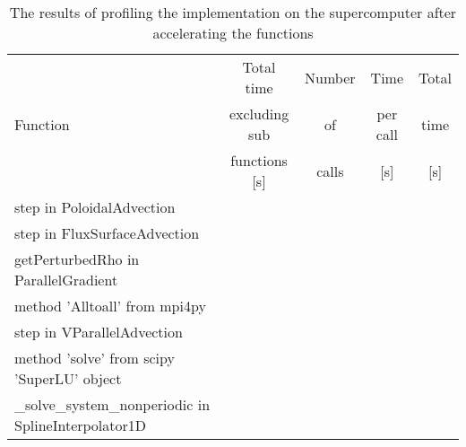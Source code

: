 \begin{table}[ht]
\centering
 \begin{tabular}{|m{}|c|c|c|c|}
  \hline
          & Total time & Number & Time & Total \\
  Function & excluding sub & of & per call & time \\
          & functions [s] & calls & [s] & [s] \\
  \hline
  \hline
  step in PoloidalAdvection &  &  &  &  \\
  \hline
  step in FluxSurfaceAdvection &  &  &  &  \\
  \hline
  getPerturbedRho in ParallelGradient &  &  &  & \\
  \hline
  method 'Alltoall' from mpi4py &  &  &  & \\
  \hline
  step in VParallelAdvection &  &  &  & \\
  \hline
  method 'solve' from scipy 'SuperLU' object &  &  &  & \\
  \hline
  \_solve\_system\_nonperiodic in SplineInterpolator1D &  &  &  & \\
  \hline
 \end{tabular}
 \caption{\label{tab::draco profile} The results of profiling the implementation on the supercomputer after accelerating the functions}
\end{table}
